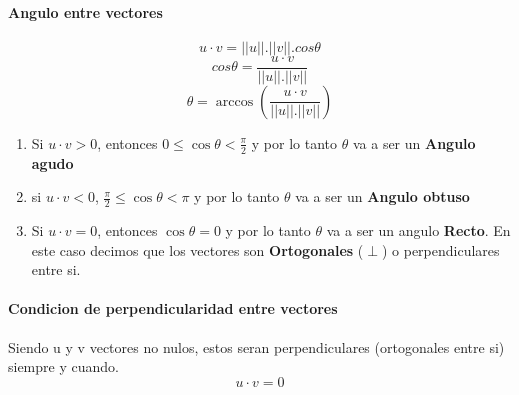\documentclass[11pt]{article}
\begin{document}
\paragraph{Angulo entre vectores}
\begin{equation*}
	u \cdot v = ||u||.||v||.cos \theta
\end{equation*}
\begin{equation*}
	cos \theta = \dfrac{u \cdot v}{||u||.||v||}
\end{equation*}
\begin{equation*}
	\theta = \arccos (\dfrac{u \cdot v}{||u||.||v||})
\end{equation*}
\begin{enumerate}
	\item Si $u \cdot v > 0$, entonces $0 \leq \cos \theta < \frac{\pi}{2}$ y por lo tanto $\theta$ va a ser un \textbf{Angulo agudo}
	\item si $u \cdot v < 0$, $\frac{\pi}{2} \leq \cos \theta < \pi$ y por lo tanto $\theta$ va a ser un \textbf{Angulo obtuso}
	\item Si $u \cdot v = 0$, entonces $\cos \theta = 0$ y por lo tanto $\theta$ va a ser un angulo \textbf{Recto}.
	En este caso decimos que los vectores son \textbf{Ortogonales} ($\perp$) o perpendiculares entre si.
\end{enumerate}
\paragraph{Condicion de perpendicularidad entre vectores}
Siendo u y v vectores no nulos, estos seran perpendiculares (ortogonales entre si) siempre y cuando.
\begin{equation*}
	u \cdot v = 0
\end{equation*}
\end{document}
